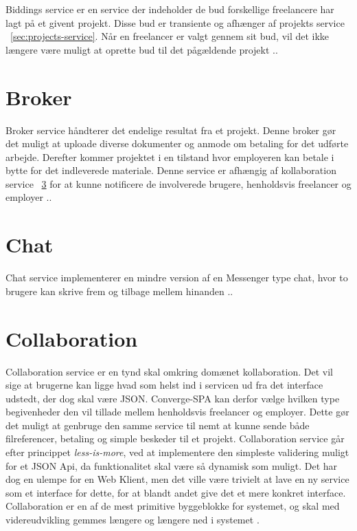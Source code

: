 Biddings service er en service der indeholder de bud forskellige freelancere har lagt på et givent projekt. Disse bud er transiente og afhænger af projekts service ~\ref{sec:projects-service}. Når en freelancer er valgt gennem sit bud, vil det ikke længere være muligt at oprette bud til det pågældende projekt \cite[Biddings-Service]{uml-diagrams}..


\section{Broker}
\label{sec:broker-service}

Broker service håndterer det endelige resultat fra et projekt. Denne broker gør det muligt at uploade diverse dokumenter og anmode om betaling for det udførte arbejde. Derefter kommer projektet i en tilstand hvor employeren kan betale i bytte for det indleverede materiale. Denne service er afhængig af kollaboration service ~\ref{sec:collaboration-service} for at kunne notificere de involverede brugere, henholdsvis freelancer og employer \cite[Broker-Service]{uml-diagrams}..

\section{Chat}
\label{sec:chat-service}

Chat service implementerer en mindre version af en Messenger type chat, hvor to brugere kan skrive frem og tilbage mellem hinanden \cite[Chat-Service]{uml-diagrams}..

\section{Collaboration}
\label{sec:collaboration-service}

Collaboration service er en tynd skal omkring domænet kollaboration. Det vil sige at brugerne kan ligge hvad som helst ind i servicen ud fra det interface udstedt, der dog skal være JSON. Converge-SPA kan derfor vælge hvilken type begivenheder den vil tillade mellem henholdsvis freelancer og employer. Dette gør det muligt at genbruge den samme service til nemt at kunne sende både filreferencer, betaling og simple beskeder til et projekt. Collaboration service går efter princippet \emph{less-is-more}, ved at implementere den simpleste validering muligt for et JSON Api, da funktionalitet skal være så dynamisk som muligt. Det har dog en ulempe for en Web Klient, men det ville være trivielt at lave en ny service som et interface for dette, for at blandt andet give det et mere konkret interface. Collaboration er en af de mest primitive byggeblokke for systemet, og skal med videreudvikling gemmes længere og længere ned i systemet \cite[Collaboration-Service]{uml-diagrams}.

